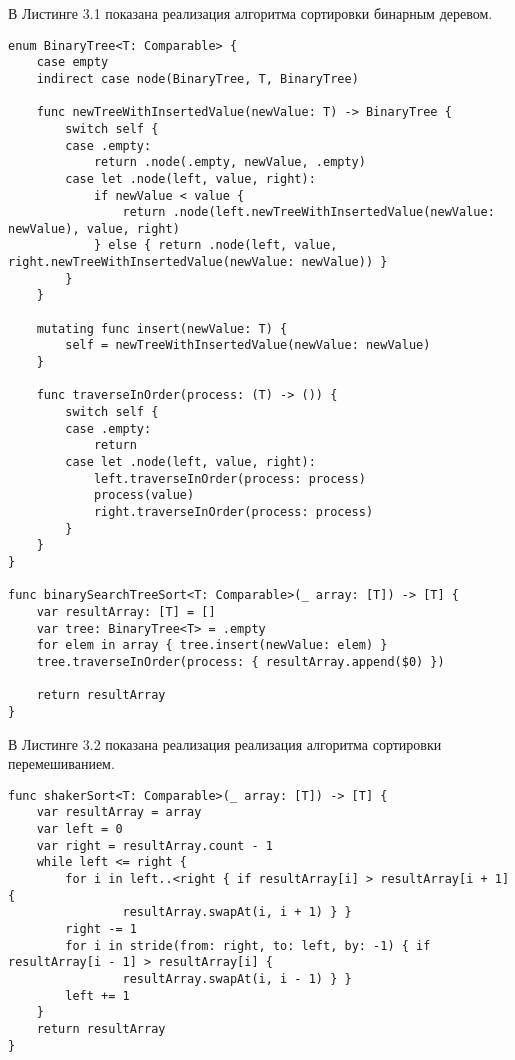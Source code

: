 \hspace{0.6cm}В Листинге 3.1 показана реализация алгоритма сортировки бинарным деревом.
\begin{lstlisting}[caption=Функция алгоритма сортировки бинарным деревом]
enum BinaryTree<T: Comparable> {
    case empty
    indirect case node(BinaryTree, T, BinaryTree)
    
    func newTreeWithInsertedValue(newValue: T) -> BinaryTree {
        switch self {
        case .empty:
            return .node(.empty, newValue, .empty)
        case let .node(left, value, right):
            if newValue < value {
                return .node(left.newTreeWithInsertedValue(newValue: newValue), value, right)
            } else { return .node(left, value, right.newTreeWithInsertedValue(newValue: newValue)) }
        }
    }
    
    mutating func insert(newValue: T) {
        self = newTreeWithInsertedValue(newValue: newValue)
    }
    
    func traverseInOrder(process: (T) -> ()) {
        switch self {
        case .empty:
            return
        case let .node(left, value, right):
            left.traverseInOrder(process: process)
            process(value)
            right.traverseInOrder(process: process)
        }
    }
}

func binarySearchTreeSort<T: Comparable>(_ array: [T]) -> [T] {
    var resultArray: [T] = []
    var tree: BinaryTree<T> = .empty
    for elem in array { tree.insert(newValue: elem) }
    tree.traverseInOrder(process: { resultArray.append($0) })
    
    return resultArray
}
\end{lstlisting}

\hspace{0.6cm}В Листинге 3.2 показана реализация реализация алгоритма сортировки перемешиванием.
\begin{lstlisting}[caption=Функция алгоритма сортировки перемешиванием]
func shakerSort<T: Comparable>(_ array: [T]) -> [T] {
    var resultArray = array
    var left = 0
    var right = resultArray.count - 1
    while left <= right {
        for i in left..<right { if resultArray[i] > resultArray[i + 1] { 
        		resultArray.swapAt(i, i + 1) } }
        right -= 1
        for i in stride(from: right, to: left, by: -1) { if resultArray[i - 1] > resultArray[i] { 
        		resultArray.swapAt(i, i - 1) } }
        left += 1
    }
    return resultArray
}
\end{lstlisting}

